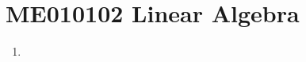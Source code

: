 


\chapter{ME010102 Linear Algebra}
\begin{enumerate}[label=Week \arabic*]
	\item 
\end{enumerate}
